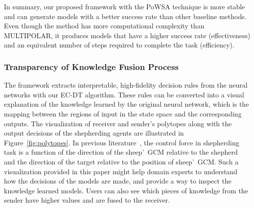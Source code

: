 \documentclass[lettersize,journal]{IEEEtran}
\begin{document}
In summary, our proposed framework with the PoWSA technique is more stable and can generate models with a better success rate than other baseline methods. Even though the method has more computational complexity than MULTIPOLAR, it produces models that have a higher success rate (effectiveness) and an equivalent number of steps required to complete the task (efficiency).  


\subsubsection{Transparency of Knowledge Fusion Process}\label{jpaper2-results-transparency}

The framework extracts interpretable, high-fidelity decision rules from the neural networks with our EC-DT algorithm. These rules can be converted into a visual explanation of the knowledge learned by the original neural network, which is the mapping between the regions of input in the state space and the corresponding outputs. The visualization of receiver and sender\textquoteright s polytopes along with the output decisions of the shepherding agents are illustrated in Figure~\ref{fig:polytopes}. In previous literature~\cite{strombom2014solving}, the control force in shepherding task is a function of the direction of the sheep\textquoteright \ GCM relative to the shepherd and the direction of the target relative to the position of sheep\textquoteright \ GCM. Such a visualization provided in this paper might help domain experts to understand how the decisions of the models are made, and provide a way to inspect the knowledge learned models. Users can also see which pieces of knowledge from the sender have higher values and are fused to the receiver.

\begin{figure*}[!htb]
\centering
    \hspace{1.5em}
    \\
    \vspace{-1em}
    \caption{The visualization of decision polytopes represents the knowledge learned through training (a) the receiver\textquoteright s neural network, and (b) the sender\textquoteright s neural network. The directions of the arrows in the polytopes are the output decisions for a corresponding region of states, which are used to control the movement of the shepherd. The polytopes in green are the ones that are sent to the receiver.}
\label{fig:polytopes}
\end{figure*}
\end{document}
